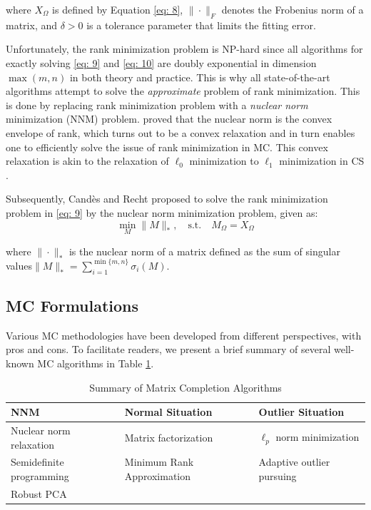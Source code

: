 where $X_{\Omega}$ is defined by Equation \ref{eq: 8}, $\|\cdot\|_F$ denotes the Frobenius norm of a matrix, and $\delta > 0$ is a tolerance parameter that limits the fitting error.

Unfortunately, the rank minimization problem is NP-hard since all algorithms for exactly solving \ref{eq: 9} and \ref{eq: 10} are doubly exponential in dimension $\max(m, n)$ in both theory and practice. This is why all state-of-the-art algorithms attempt to solve the \textit{approximate} problem of rank minimization. This is done by replacing rank minimization problem with a \textit{nuclear norm} minimization (NNM) problem. \cite{fazel2002matrix} proved that the nuclear norm is the convex envelope of rank, which turns out to be a convex relaxation and in turn enables one to efficiently solve the issue of rank minimization in MC. This convex relaxation is akin to the relaxation of $\ell_0$ minimization to $\ell_1$ minimization in CS \cite{candes2008introduction}.

Subsequently, Cand\`es and Recht proposed to solve the rank minimization problem in \ref{eq: 9} by the nuclear norm minimization problem, given as:
\begin{equation}
    \min_{M} \|M\|_*, \quad \text{s.t.} \quad M_{\Omega} = X_{\Omega} \label{eq: 11}
\end{equation}

where $\|\cdot\|_*$ is the nuclear norm of a matrix defined as the sum of singular values$ \| M \|_* = \sum_{i=1}^{\min\{m,n\}} \sigma_i(M)$.


\subsection{MC Formulations}
Various MC methodologies have been developed from different perspectives, with pros and cons. To facilitate readers, we present a brief summary of several well-known MC algorithms in Table \ref{tab:mc_algorithms}.

\begin{table}[H]
\centering
\caption{Summary of Matrix Completion Algorithms}
\label{tab:mc_algorithms}
\begin{tabular}{@{}lll@{}}
\toprule
NNM & Normal Situation & Outlier Situation \\ \midrule
Nuclear norm relaxation & Matrix factorization & $\ell_{p}$ norm minimization \\
Semidefinite programming & Minimum Rank Approximation & Adaptive outlier pursuing\\
Robust PCA &  &  \\ \bottomrule
\end{tabular}
\end{table}

